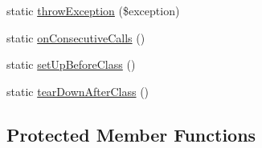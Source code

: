 \begin{DoxyCompactItemize}
\item 
static \mbox{\hyperlink{class_p_h_p_unit___framework___test_case_ad188456c04a828ed6701551da5f8c4e9}{throw\+Exception}} (\$exception)
\item 
static \mbox{\hyperlink{class_p_h_p_unit___framework___test_case_a8dffb4554ade13222400d1a65349b6d9}{on\+Consecutive\+Calls}} ()
\item 
static \mbox{\hyperlink{class_p_h_p_unit___framework___test_case_a80ef9eb20e7443b38276fb4647985fb7}{set\+Up\+Before\+Class}} ()
\item 
static \mbox{\hyperlink{class_p_h_p_unit___framework___test_case_a6256aa1772f8d1a6b16f1df662d94433}{tear\+Down\+After\+Class}} ()
\end{DoxyCompactItemize}
\subsection*{Protected Member Functions}
